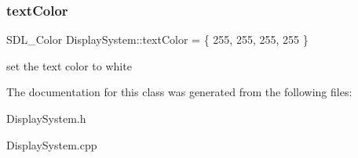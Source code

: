 \subsubsection{\texorpdfstring{text\+Color}{textColor}}
{\footnotesize\ttfamily S\+D\+L\+\_\+\+Color Display\+System\+::text\+Color = \{ 255, 255, 255, 255 \}\hspace{0.3cm}{\ttfamily [private]}}

set the text color to white 

The documentation for this class was generated from the following files\+:\begin{DoxyCompactItemize}
\item 
Display\+System.\+h\item 
Display\+System.\+cpp\end{DoxyCompactItemize}
